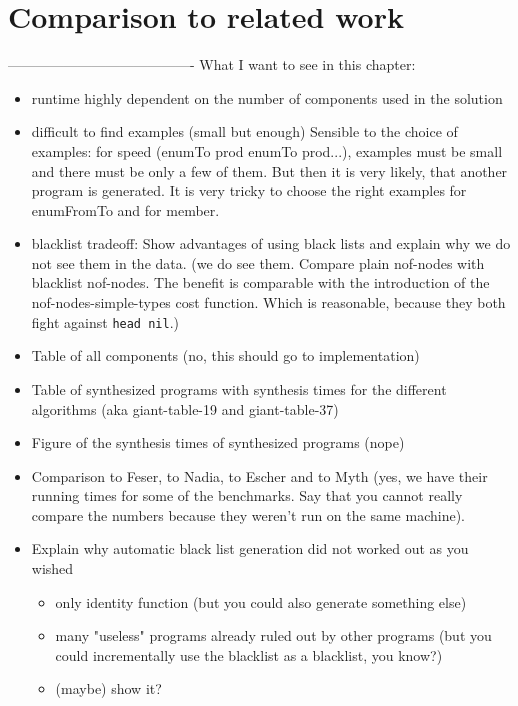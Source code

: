 \section{Comparison to related work}








----------------------------------------
What I want to see in this chapter:
\begin{itemize}
\item runtime highly dependent on the number of components used in the solution 
\item difficult to find examples (small but enough)
Sensible to the choice of examples: for speed (enumTo prod enumTo prod...), examples must be small and there must be only a few of them. But then it is very likely, that another program is generated. It is very tricky to choose the right examples for enumFromTo and for member.
\item blacklist tradeoff: Show advantages of using black lists and explain why we do not see them in the data. (we do see them. Compare plain nof-nodes with blacklist nof-nodes. The benefit is comparable with the introduction of the nof-nodes-simple-types cost function. Which is reasonable, because they both fight against \lstinline?head nil?.)
\item Table of all components (no, this should go to implementation)
\item Table of synthesized programs with synthesis times for the different algorithms (aka giant-table-19 and giant-table-37)
\item Figure of the synthesis times of synthesized programs (nope)
\item Comparison to Feser, to Nadia, to Escher and to Myth (yes, we have their running times for some of the benchmarks. Say that you cannot really compare the numbers because they weren't run on the same machine).
\item Explain why automatic black list generation did not worked out as you wished
\begin{itemize}
\item only identity function (but you could also generate something else)
\item many "useless" programs already ruled out by other programs (but you could incrementally use the blacklist as a blacklist, you know?)
\item (maybe) show it?

\end{itemize}
\end{itemize}
